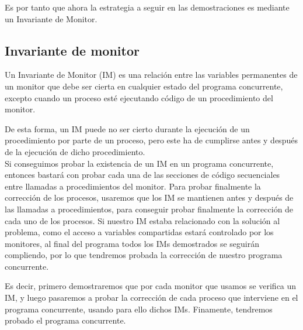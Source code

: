 Es por tanto que ahora la estrategia a seguir en las demostraciones es mediante un Invariante de Monitor.

\subsection{Invariante de monitor}
\begin{definicion}
    Un Invariante de Monitor (IM) es una relación entre las variables permanentes de un monitor que debe ser cierta en cualquier estado del programa concurrente, excepto cuando un proceso esté ejecutando código de un procedimiento del monitor.
\end{definicion}
De esta forma, un IM puede no ser cierto durante la ejecución de un procedimiento por parte de un proceso, pero este ha de cumplirse antes y después de la ejecución de dicho procedimiento.\\

Si conseguimos probar la existencia de un IM en un programa concurrente, entonces bastará con probar cada una de las secciones de código secuenciales entre llamadas a procedimientos del monitor. Para probar finalmente la corrección de los procesos, usaremos que los IM se mantienen antes y después de las llamadas a procedimientos, para conseguir probar finalmente la corrección de cada uno de los procesos. Si nuestro IM estaba relacionado con la solución al problema, como el acceso a variables compartidas estará controlado por los monitores, al final del programa todos los IMs demostrados se seguirán compliendo, por lo que tendremos probada la corrección de nuestro programa concurrente.

Es decir, primero demostraremos que por cada monitor que usamos se verifica un IM, y luego pasaremos a probar la corrección de cada proceso que interviene en el programa concurrente, usando para ello dichos IMs. Finamente, tendremos probado el programa concurrente.

